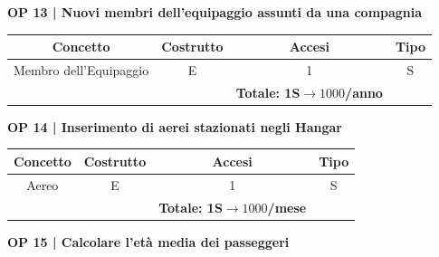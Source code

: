\vspace{.6cm}


\textbf{\small OP 13 | Nuovi membri dell'equipaggio assunti da una compagnia}\\

\begin{tabular}{ c c c c} 
	\hline
	\rowcolor{airforceblue}
	\textbf{\color{white}Concetto} & \textbf{\color{white}Costrutto} & \textbf{\color{white}Accesi} & \textbf{\color{white}Tipo}\\
	\hline
	\textsf{\small Membro dell'Equipaggio} & \textsf{\small E} & \textsf{\small 1} &  \textsf{\small S}\\
	\hline
	\rowcolor{airforceblue}
	\textsf{\small } & \textsf{\small } & \textbf{\color{white}Totale: 1S$\rightarrow 1000$/anno } \textsf{\small } & \textsf{\small }\\ %
	\hline
\end{tabular}

\vspace{.6cm}


\textbf{\small OP 14 | Inserimento di aerei stazionati negli Hangar}\\

\begin{tabular}{ c c c c}
	\hline
	\rowcolor{airforceblue}
	\textbf{\color{white}Concetto} & \textbf{\color{white}Costrutto} & \textbf{\color{white}Accesi} & \textbf{\color{white}Tipo}\\
	\hline
	\textsf{\small Aereo} & \textsf{\small E} & \textsf{\small 1} &  \textsf{\small S}\\
	\hline
	\rowcolor{airforceblue}
	\textsf{\small } & \textsf{\small } & \textbf{\color{white}Totale: 1S$\rightarrow 1000$/mese } \textsf{\small } & \textsf{\small }\\ %
	\hline
\end{tabular}

\vspace{.6cm}


\textbf{\small OP 15 | Calcolare l'età media dei passeggeri}\\


